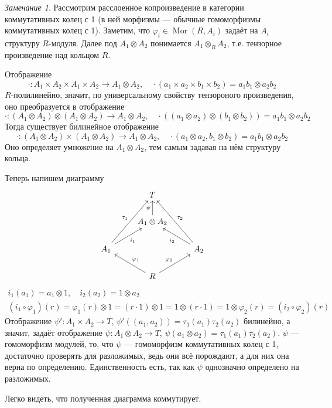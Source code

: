 \documentclass{article}
\theoremstyle{definition}
\theoremstyle{remark}
\newtheorem*{remark}{Замечание}
\DeclareMathOperator{\Mor}{Mor}
\begin{document}
\begin{remark}
    Рассмотрим расслоенное копроизведение в категории коммутативных колец с 1 (в ней морфизмы --- обычные гомоморфизмы коммутативных колец с 1). Заметим, что $\varphi_i \in \Mor(R, A_i)$ задаёт на $A_i$ структуру $R$-модуля. Далее под $A_1 \otimes A_2$ понимается $A_1 \otimes_R A_2$, т.е. тензорное произведение над кольцом $R$.

    Отображение
    \begin{equation*}
        \cdot: A_1 \times A_2 \times A_1 \times A_2 \to A_1 \otimes A_2, \quad \cdot(a_1 \times a_2 \times b_1 \times b_2) = a_1 b_1 \otimes a_2 b_2
    \end{equation*}
    $R$-полилинейно, значит, по универсальному свойству тензороного произведения, оно преобразуется в отображение
    \begin{equation*}
        \cdot: (A_1 \otimes A_2) \otimes (A_1 \otimes A_2) \to A_1 \otimes A_2, \quad \cdot((a_1 \otimes a_2) \otimes (b_1 \otimes b_2)) = a_1 b_1 \otimes a_2 b_2
    \end{equation*}
    Тогда существует билинейное отображение
    \begin{equation*}
        \cdot: (A_1 \otimes A_2) \times (A_1 \otimes A_2) \to A_1 \otimes A_2, \quad \cdot(a_1 \otimes a_2, b_1 \otimes b_2) = a_1 b_1 \otimes a_2 b_2
    \end{equation*}
    Оно определяет умножение на $A_1 \otimes A_2$, тем самым задавая на нём структуру кольца.
    
    Теперь напишем диаграмму
    \begin{equation*}
    \begin{tikzcd}
        & T & \\
        & A_1 \otimes A_2 \ar{u}{\psi} & \\
        A_1 \ar[swap]{ur}{i_1} \ar{uur}{\tau_1} & & A_2 \ar{ul}{i_2} \ar[swap]{uul}{\tau_2}  \\
        & R \ar[swap]{ul}{\varphi_1} \ar{ur}{\varphi_2} &
    \end{tikzcd}
    \end{equation*}
    \begin{gather*}
        i_1(a_1) = a_1 \otimes 1, \quad i_2(a_2) = 1 \otimes a_2 \\
        (i_1 \circ \varphi_1)(r) = \varphi_1(r) \otimes 1 = (r \cdot 1) \otimes 1 = 1 \otimes (r \cdot 1) = 1 \otimes \varphi_2(r) = (i_2 \circ \varphi_2)(r)
    \end{gather*}
	Отображение $\psi': A_1 \times A_2 \to T$, $\psi'((a_1, a_2)) = \tau_1(a_1) \tau_2(a_2)$ билинейно, а значит, задаёт отображение $\psi: A_1 \otimes A_2 \to T$, $\psi(a_1 \otimes a_2) = \tau_1(a_1) \tau_2(a_2)$. $\psi$ --- гомоморфизм модулей, то, что $\psi$ --- гомоморфизм коммутативных колец с 1, достаточно проверять для разложимых, ведь они всё порождают, а для них она верна по определению. Единственность есть, так как $\psi$ однозначно определено на разложимых.

    Легко видеть, что полученная диаграмма коммутирует.
\end{remark}
\end{document}
